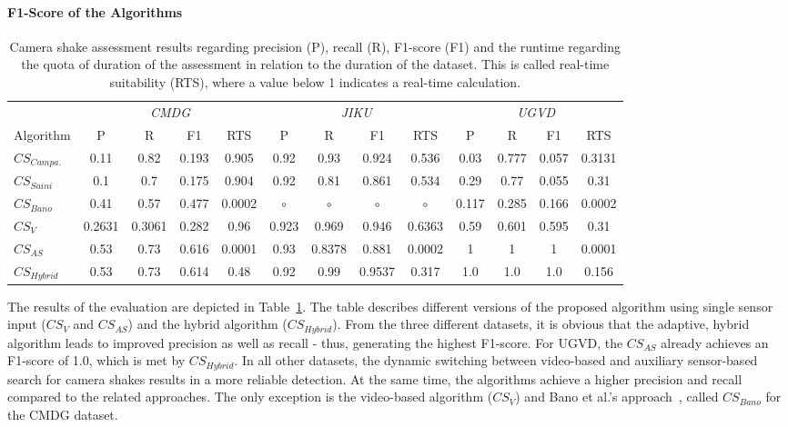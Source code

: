 \paragraph{F1-Score of the Algorithms}
\begin{table}[!htb]
	\centering
	\begin{tabular}{lcccccccccccc}
		\toprule
			& \multicolumn{4}{c}{\textit{CMDG}} & \multicolumn{4}{c}{\textit{JIKU}} & \multicolumn{4}{c}{\textit{UGVD}}  \\
				\cmidrule(lr){2-5}
				\cmidrule(lr){6-9}
				\cmidrule(lr){10-13}
		Algorithm & P & R & F1 & RTS & P & R & F1 & RTS & P & R & F1 & RTS  \\
		\midrule
		$CS_{Campa.}$ & 0.11 & 0.82 & 0.193 & 0.905& 0.92 & 0.93 & 0.924 & 0.536 & 0.03& 0.777 & 0.057 & 0.3131\\
		$CS_{Saini}$ & 0.1 & 0.7 & 0.175 &  0.904 & 0.92 & 0.81 & 0.861 &0.534 & 0.29 & 0.77 & 0.055 & 0.31 \\
		$CS_{Bano}$ & 0.41 & 0.57 & 0.477 &0.0002 & $\circ$&$\circ$ & $\circ$ & $\circ$ &0.117 & 0.285 & 0.166 &0.0002 \\
		\midrule
		$CS_{V}$ & 0.2631 & 0.3061 & 0.282 & 0.96 & 0.923 & 0.969& 0.946 & 0.6363 &0.59 &0.601 & 0.595 & 0.31 \\
		$CS_{AS}$ & 0.53 & 0.73 & 0.616 & 0.0001 & 0.93 & 0.8378 & 0.881 & 0.0002 & 1 & 1 &  1 & 0.0001 \\
		$CS_{Hybrid}$ & 0.53 & 0.73 & 0.614 & 0.48 & 0.92 & 0.99 & 0.9537 & 0.317 & 1.0 & 1.0 & 1.0  & 0.156 \\ %
		\bottomrule
		\end{tabular}
		\caption[Evaluation results for camera shake algorithms]{Camera shake assessment results regarding precision (P), recall (R), F1-score (F1) and the runtime regarding the quota of duration of the assessment in relation to the duration of the dataset. This is called real-time suitability (RTS), where a value below 1 indicates a real-time calculation.}
		\label{tab:556_eval_camera_shake_table}
\end{table}
The results of the evaluation are depicted in Table~\ref{tab:556_eval_camera_shake_table}.
The table describes different versions of the proposed algorithm using single sensor input ($CS_{V}$ and $CS_{AS}$) and the hybrid algorithm ($CS_{Hybrid}$).
From the three different datasets, it is obvious that the adaptive, hybrid algorithm leads to improved precision as well as recall - thus,  generating the highest F1-score. 
For UGVD, the $CS_{AS}$ already achieves an F1-score of 1.0, which is met by $CS_{Hybrid}$. 
In all other datasets, the dynamic switching between video-based and auxiliary sensor-based search for camera shakes results in a more reliable detection. 
At the same time, the algorithms achieve a higher precision and recall compared to the related approaches.
The only exception is the video-based algorithm ($CS_{V}$) and Bano et al.'s approach~\cite{Bano2015}, called $CS_{Bano}$ for the CMDG dataset. 

